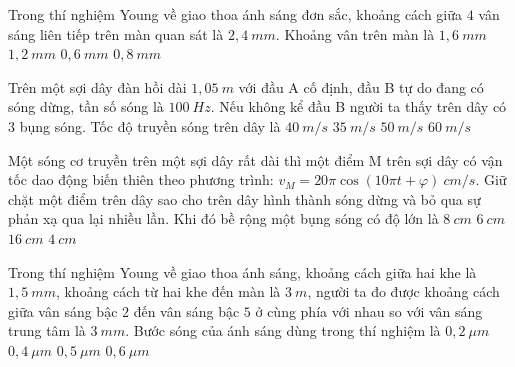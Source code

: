 	\begin{ex} %
		Trong thí nghiệm Young về giao thoa ánh sáng đơn sắc, khoảng cách giữa $4$ vân sáng liên tiếp trên màn quan sát là $2,4\ mm$. Khoảng vân trên màn là
		\choice
		{$1,6\ mm$}	
		{$1,2\ mm$}
		{$0,6\ mm$}	
		{\True $0,8\ mm$}
	\end{ex}
	\begin{ex}%
		Trên một sợi dây đàn hồi dài $1,05\ m$ với đầu A cố định, đầu B tự do đang có sóng dừng, tần số sóng là $100\ Hz$. Nếu không kể đầu B người ta thấy trên dây có $3$ bụng sóng. Tốc độ truyền sóng trên dây là
		\choice
		{$40\ m/s$}
		{$35\ m/s$}
		{$50\ m/s$}
		{\True $60\ m/s$}
	\end{ex}
	\begin{ex}%
		Một sóng cơ truyền trên một sợi dây rất dài thì một điểm M trên sợi dây có vận tốc dao động biến thiên theo phương trình:  $v_M=20\pi \cos(10\pi t + \varphi )\ cm/s$. Giữ chặt một điểm trên dây sao cho trên dây hình thành sóng dừng và bỏ qua sự phản xạ qua lại nhiều lần. Khi đó bề rộng một bụng sóng có độ lớn là
		\choice
		{\True $8\ cm$}
		{$6\ cm$}
		{$16\ cm$}
		{$4\ cm$}
	\end{ex}
	\begin{ex}%
		Trong thí nghiệm Young về giao thoa ánh sáng, khoảng cách giữa hai khe là $1,5\ mm$, khoảng cách từ hai khe đến màn là $3\ m$, người ta đo được khoảng cách giữa vân sáng bậc $2$ đến vân sáng bậc $5$ ở cùng phía với nhau so với vân sáng trung tâm là $3\ mm$. Bước sóng của ánh sáng dùng trong thí nghiệm là
		\choice
		{$0,2\ \mu m $}
		{$0,4\ \mu m $}
		{\True $0,5\ \mu m $}
		{$0,6\ \mu m $}
	\end{ex}
